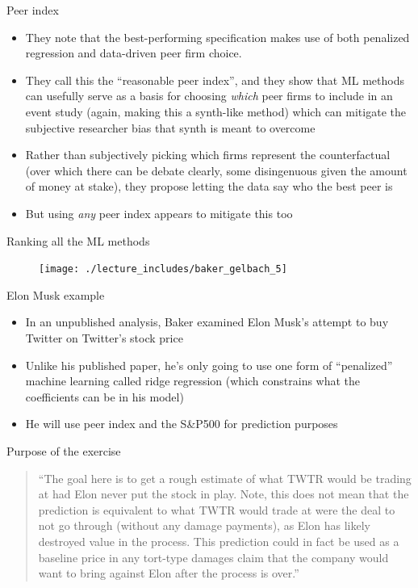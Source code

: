 \documentclass{beamer}
\begin{document}
\begin{frame}{Peer index}

\begin{itemize}
\item They note that the best-performing specification makes use of both penalized regression and data-driven peer firm choice.
\item They call this the ``reasonable peer index'', and they show that ML methods can usefully serve as a basis for choosing \emph{which} peer firms to include in an event study (again, making this a synth-like method) which can mitigate the subjective researcher bias that synth is meant to overcome
\item Rather than subjectively picking which firms represent the counterfactual (over which there can be debate clearly, some disingenuous given the amount of money at stake), they propose letting the data say who the best peer is
\item But using \emph{any} peer index appears to mitigate this too
\end{itemize}

\end{frame}

\begin{frame}{Ranking all the ML methods}

\begin{figure}
\texttt{[image: ./lecture\_includes/baker\_gelbach\_5]}
\end{figure}
\end{frame}

\begin{frame}{Elon Musk example}

\begin{itemize}
\item In an unpublished analysis, Baker examined Elon Musk's attempt to buy Twitter on Twitter's stock price
\item Unlike his published paper, he's only going to use one form of ``penalized'' machine learning called ridge regression (which constrains what the coefficients can be in his model)
\item He will use peer index and the S\&P500 for prediction purposes
\end{itemize}

\end{frame}

\begin{frame}{Purpose of the exercise}

\begin{quote}
``The goal here is to get a rough estimate of what TWTR would be trading at had Elon never put the stock in play. Note, this does not mean that the prediction is equivalent to what TWTR would trade at were the deal to not go through (without any damage payments), as Elon has likely destroyed value in the process. This prediction could in fact be used as a baseline price in any tort-type damages claim that the company would want to bring against Elon after the process is over.''
\end{quote}

\end{frame}
\end{document}
